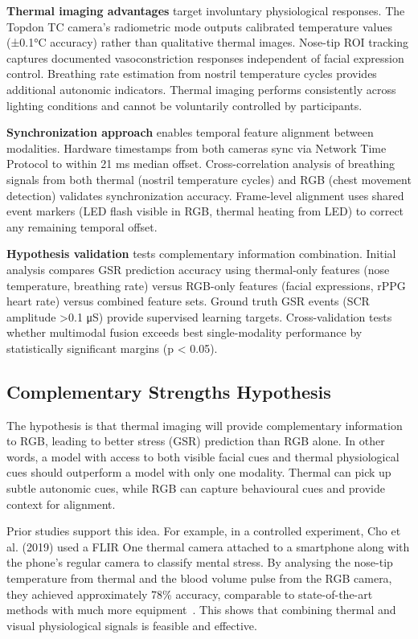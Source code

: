 \textbf{Thermal imaging advantages} target involuntary physiological responses. The Topdon TC camera's radiometric mode outputs calibrated temperature values (±0.1°C accuracy) rather than qualitative thermal images. Nose-tip ROI tracking captures documented vasoconstriction responses independent of facial expression control. Breathing rate estimation from nostril temperature cycles provides additional autonomic indicators. Thermal imaging performs consistently across lighting conditions and cannot be voluntarily controlled by participants.

\textbf{Synchronization approach} enables temporal feature alignment between modalities. Hardware timestamps from both cameras sync via Network Time Protocol to within 21 ms median offset. Cross-correlation analysis of breathing signals from both thermal (nostril temperature cycles) and RGB (chest movement detection) validates synchronization accuracy. Frame-level alignment uses shared event markers (LED flash visible in RGB, thermal heating from LED) to correct any remaining temporal offset.

\textbf{Hypothesis validation} tests complementary information combination. Initial analysis compares GSR prediction accuracy using thermal-only features (nose temperature, breathing rate) versus RGB-only features (facial expressions, rPPG heart rate) versus combined feature sets. Ground truth GSR events (SCR amplitude >0.1 μS) provide supervised learning targets. Cross-validation tests whether multimodal fusion exceeds best single-modality performance by statistically significant margins (p < 0.05).

\subsection{Complementary Strengths Hypothesis}

The hypothesis is that thermal imaging will provide complementary information to RGB, leading to better stress (GSR) prediction than RGB alone. In other words, a model with access to both visible facial cues and thermal physiological cues should outperform a model with only one modality. Thermal can pick up subtle autonomic cues, while RGB can capture behavioural cues and provide context for alignment.

Prior studies support this idea. For example, in a controlled experiment, Cho et al. (2019) used a FLIR One thermal camera attached to a smartphone along with the phone's regular camera to classify mental stress. By analysing the nose-tip temperature from thermal and the blood volume pulse from the RGB camera, they achieved approximately 78\% accuracy, comparable to state-of-the-art methods with much more equipment~\cite{zhang2021human}. This shows that combining thermal and visual physiological signals is feasible and effective.

